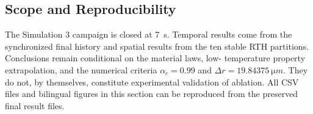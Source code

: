 \documentclass[oneside,openany]{amsdtx}
\begin{document}
\subsection{Scope and Reproducibility}

The Simulation 3 campaign is closed at \SI{7}{s}. Temporal results come from
the synchronized final history and spatial results from the ten stable RTH
partitions. Conclusions remain conditional on the material laws, low-
temperature property extrapolation, and the numerical criteria
\(\alpha_c=0.99\) and \(\Delta r=\SI{19.84375}{\micro m}\). They do not, by
themselves, constitute experimental validation of ablation. All CSV files and
bilingual figures in this section can be reproduced from the preserved final
result files.

\clearpage
\renewcommand{\refname}{References}
\renewcommand{\bibname}{References}
\end{document}
